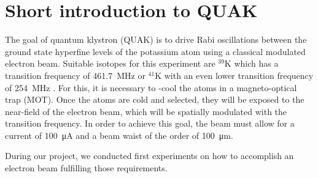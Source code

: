 
\chapter{Short introduction to QUAK}
\label{ch:Short introduction to QuaK}

The goal of quantum klystron (QUAK)\cite{rätzel2020quantum} is to drive Rabi oscillations between the ground state hyperfine levels of the potassium atom using a classical modulated electron beam. Suitable isotopes for this experiment are $^{39}\mathrm{K}$ which has a transition frequency of \SI{461.7}{\mega\hertz} or $^{41}\mathrm{K}$ with an even lower transition frequency of \SI{254}{\mega\hertz} \cite{tiecke:potassium-properties}. For this, it is necessary to -cool the atoms in a magneto-optical trap (MOT). Once the atoms are cold and selected, they will be exposed to the near-field of the electron beam, which will be spatially modulated with the transition frequency. In order to achieve this goal, the beam must allow for a current of \SI{100}{\micro\ampere} and a beam waist of the order of \SI{100}{\micro\meter}.

During our project, we conducted first experiments on how to accomplish an electron beam fulfilling those requirements.